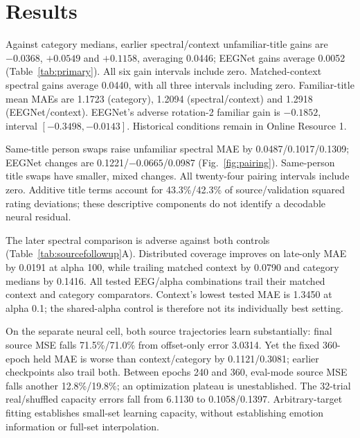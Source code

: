 \documentclass[12pt,a4paper]{article}
\begin{document}
\section{Results}


Against category medians, earlier spectral/context unfamiliar-title gains are \(-0.0368\), \(+0.0549\) and \(+0.1158\), averaging 0.0446; EEGNet gains average 0.0052 (Table~\ref{tab:primary}). All six gain intervals include zero. Matched-context spectral gains average 0.0440, with all three intervals including zero. Familiar-title mean MAEs are 1.1723 (category), 1.2094 (spectral/context) and 1.2918 (EEGNet/context). EEGNet's adverse rotation-2 familiar gain is \(-0.1852\), interval \([-0.3498,-0.0143]\). Historical conditions remain in Online Resource 1.





Same-title person swaps raise unfamiliar spectral MAE by 0.0487/0.1017/0.1309; EEGNet changes are 0.1221/\(-0.0665\)/0.0987 (Fig.~\ref{fig:pairing}). Same-person title swaps have smaller, mixed changes. All twenty-four pairing intervals include zero. Additive title terms account for 43.3\%/42.3\% of source/validation squared rating deviations; these descriptive components do not identify a decodable neural residual.





The later spectral comparison is adverse against both controls (Table~\ref{tab:sourcefollowup}A). Distributed coverage improves on late-only MAE by 0.0191 at alpha 100, while trailing matched context by 0.0790 and category medians by 0.1416. All tested EEG/alpha combinations trail their matched context and category comparators. Context's lowest tested MAE is 1.3450 at alpha 0.1; the shared-alpha control is therefore not its individually best setting.


On the separate neural cell, both source trajectories learn substantially: final source MSE falls 71.5\%/71.0\% from offset-only error 3.0314. Yet the fixed 360-epoch held MAE is worse than context/category by 0.1121/0.3081; earlier checkpoints also trail both. Between epochs 240 and 360, eval-mode source MSE falls another 12.8\%/19.8\%; an optimization plateau is unestablished. The 32-trial real/shuffled capacity errors fall from 6.1130 to 0.1058/0.1397. Arbitrary-target fitting establishes small-set learning capacity, without establishing emotion information or full-set interpolation.
\end{document}
